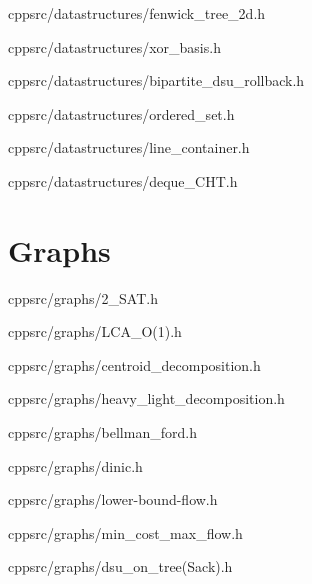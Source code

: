 \documentclass[portrait, 8pt, a4paper, oneside, twocolumn]{extarticle}
\begin{document}
    {}
    {}
    {cpp}{src/datastructures/fenwick_tree_2d.h}
    \noindent\hrulefill

    {}
    {}
    {cpp}{src/datastructures/xor_basis.h}
    \noindent\hrulefill

    {}
    {}
    {cpp}{src/datastructures/bipartite_dsu_rollback.h}
    \noindent\hrulefill

    {}
    {}
    {cpp}{src/datastructures/ordered_set.h}
    \noindent\hrulefill

    {}
    {}
    {cpp}{src/datastructures/line_container.h}
    \noindent\hrulefill

    {}
    {}
    {cpp}{src/datastructures/deque_CHT.h}
    \noindent\hrulefill

\section{Graphs}
	{}
	{}
	{cpp}{src/graphs/2_SAT.h}
	\noindent\hrulefill

	{}
	{}
	{cpp}{src/graphs/LCA_O(1).h}
	\noindent\hrulefill

	{}
	{}
	{cpp}{src/graphs/centroid_decomposition.h}
	\noindent\hrulefill

	{}
	{}
	{cpp}{src/graphs/heavy_light_decomposition.h}
	\noindent\hrulefill

	{}
	{}
	{cpp}{src/graphs/bellman_ford.h}
	\noindent\hrulefill



	{}
	{}
	{cpp}{src/graphs/dinic.h}
	\noindent\hrulefill

	{}
	{}
	{cpp}{src/graphs/lower-bound-flow.h}
	\noindent\hrulefill

	{}
	{}
	{cpp}{src/graphs/min_cost_max_flow.h}
	\noindent\hrulefill

	{}
	{}
	{cpp}{src/graphs/dsu_on_tree(Sack).h}
	\noindent\hrulefill
\end{document}

